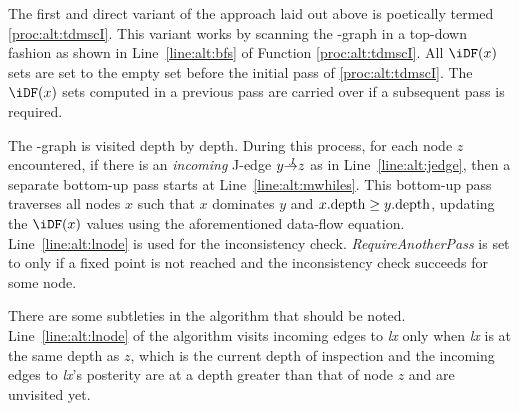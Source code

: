 {The first and direct variant of the approach laid out above is poetically 
termed \ref{proc:alt:tdmscI}.  This variant works by scanning the \DJ-graph in 
a top-down fashion as shown in Line~\ref{line:alt:bfs} of Function 
\ref{proc:alt:tdmscI}.
All $\iDF(x)$ sets are set to the empty set before the initial pass of 
\ref{proc:alt:tdmscI}.  The $\iDF(x)$ sets computed in a previous pass are 
carried over if a subsequent pass is required.

The \DJ-graph is visited depth by depth. 
During this process, for each node $z$ encountered, if there is an \emph{incoming} J-edge $y \st{J} z$ as in Line~\ref{line:alt:jedge}, then a separate bottom-up pass starts at Line~\ref{line:alt:mwhiles}. 
This bottom-up pass traverses all nodes $x$ such that $x$ dominates $y$ and $x.\textrm{depth} \geq y.\textrm{depth}$, updating the $\iDF(x)$ values using the aforementioned data-flow equation. 
Line~\ref{line:alt:lnode} is used for the inconsistency check. 
\textit{RequireAnotherPass} is set to \true only if a fixed point is not reached and the inconsistency check succeeds for some node.

There are some subtleties in the algorithm that should be noted. 
Line~\ref{line:alt:lnode} of the algorithm visits incoming edges to \textit{lx} only when \textit{lx} is at the same depth as $z$, which is the current depth of inspection and the incoming edges to \textit{lx}'s posterity are at a depth greater than that of node $z$ and are unvisited yet.

}
